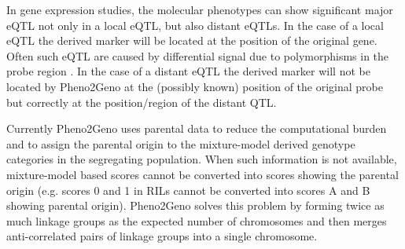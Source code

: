 In gene expression studies, the molecular phenotypes can show significant major eQTL not only in 
a local eQTL, but also distant eQTLs. In the case of a local eQTL the derived marker will be 
located at the position of the original gene. Often such eQTL are caused by differential signal 
due to polymorphisms in the probe region \cite{Alberts:2005, Alberts:2007}. In the case of a 
distant eQTL the derived marker will not be located by Pheno2Geno at the (possibly known) 
position of the original probe but correctly at the position/region of the distant QTL. \newline

Currently Pheno2Geno uses parental data to reduce the computational burden and to assign the 
parental origin to the mixture-model derived genotype categories in the segregating population. 
When such information is not available, mixture-model based scores cannot be converted into 
scores showing the parental origin (e.g. scores 0 and 1 in RILs cannot be converted into scores 
A and B showing parental origin). Pheno2Geno solves this problem by forming twice as much 
linkage groups as the expected number of chromosomes and then merges anti-correlated pairs 
of linkage groups into a single chromosome. \newline

